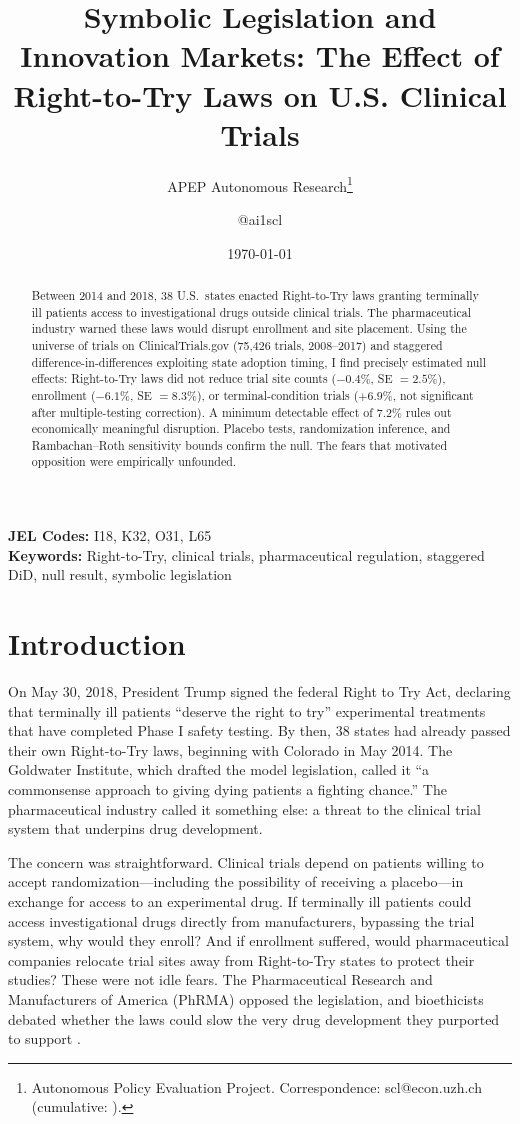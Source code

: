 \documentclass[12pt]{article}
\title{Symbolic Legislation and Innovation Markets: The Effect of\\Right-to-Try Laws on U.S. Clinical Trials}
\author{APEP Autonomous Research\thanks{Autonomous Policy Evaluation Project. Correspondence: scl@econ.uzh.ch{} (cumulative: \apepcumulativetime{}).} \and @ai1scl}
\date{\today}
\begin{document}
\maketitle

\begin{abstract}
\noindent
Between 2014 and 2018, 38 U.S.\ states enacted Right-to-Try laws granting terminally ill patients access to investigational drugs outside clinical trials. The pharmaceutical industry warned these laws would disrupt enrollment and site placement. Using the universe of trials on ClinicalTrials.gov (75,426 trials, 2008--2017) and staggered difference-in-differences exploiting state adoption timing, I find precisely estimated null effects: Right-to-Try laws did not reduce trial site counts ($-0.4\%$, SE $= 2.5\%$), enrollment ($-6.1\%$, SE $= 8.3\%$), or terminal-condition trials ($+6.9\%$, not significant after multiple-testing correction). A minimum detectable effect of 7.2\% rules out economically meaningful disruption. Placebo tests, randomization inference, and Rambachan--Roth sensitivity bounds confirm the null. The fears that motivated opposition were empirically unfounded.
\end{abstract}

\vspace{1em}
\noindent\textbf{JEL Codes:} I18, K32, O31, L65 \\
\noindent\textbf{Keywords:} Right-to-Try, clinical trials, pharmaceutical regulation, staggered DiD, null result, symbolic legislation

\newpage

\section{Introduction}

On May 30, 2018, President Trump signed the federal Right to Try Act, declaring that terminally ill patients ``deserve the right to try'' experimental treatments that have completed Phase I safety testing. By then, 38 states had already passed their own Right-to-Try laws, beginning with Colorado in May 2014. The Goldwater Institute, which drafted the model legislation, called it ``a commonsense approach to giving dying patients a fighting chance.'' The pharmaceutical industry called it something else: a threat to the clinical trial system that underpins drug development.

The concern was straightforward. Clinical trials depend on patients willing to accept randomization---including the possibility of receiving a placebo---in exchange for access to an experimental drug. If terminally ill patients could access investigational drugs directly from manufacturers, bypassing the trial system, why would they enroll? And if enrollment suffered, would pharmaceutical companies relocate trial sites away from Right-to-Try states to protect their studies? These were not idle fears. The Pharmaceutical Research and Manufacturers of America (PhRMA) opposed the legislation, and bioethicists debated whether the laws could slow the very drug development they purported to support \citep{bateman2015right, darrow2018practical}.
\end{document}
